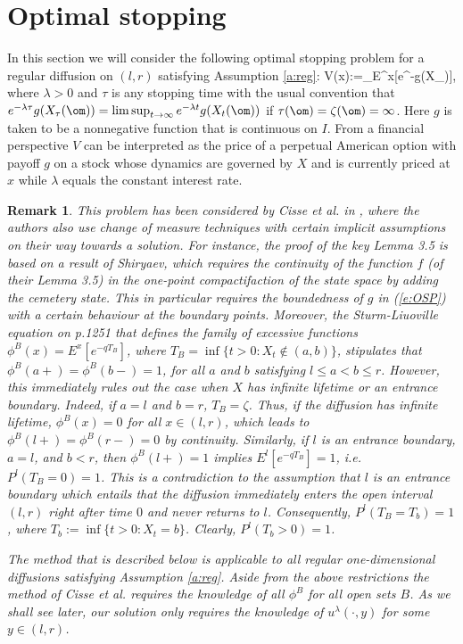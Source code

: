 \documentclass[11pt,reqno]{amsart}
\numberwithin{equation}{section}
\newtheorem{remark}{Remark}[section]
\def\rar{\rightarrow}
\begin{document}
\section{Optimal stopping} \label{s:OS}
In this section we will consider the  following optimal stopping problem for a regular diffusion on $(l,r)$ satisfying Assumption \ref{a:reg}:
\be \label{e:OSP}
V(x):=\sup_{\tau \leq \zeta}E^x[e^{-\lambda \tau}g(X_{\tau})],
\ee
where $\lambda>0$ and $\tau$ is any stopping time with the usual convention that $e^{-\lambda \tau}g(X_{\tau}(\om))=\limsup_{t\rar \infty}e^{-\lambda t}g(X_{t}(\om))$ if $\tau(\om)=\zeta(\om)=\infty$. Here $g$ is taken to be a nonnegative function that is continuous on $I$.  From a financial perspective $V$ can be interpreted as the price of a perpetual American option with payoff $g$ on a stock whose dynamics are governed by $X$ and is currently priced at $x$  while $\lambda$ equals  the constant interest rate.  
\begin{remark} \label{r:cetal}
	This problem has been considered by Cisse et al. in \cite{CPT}, where the authors also use change of measure techniques with certain implicit assumptions on their way towards a solution. For instance, the proof of the key Lemma 3.5 is based on a result of Shiryaev, which requires the continuity of the function $f$ (of their Lemma 3.5) in the one-point compactifaction of the state space by adding the cemetery state. This in particular requires the boundedness of $g$ in (\ref{e:OSP}) with a certain behaviour at the boundary points. Moreover, the Sturm-Liuoville equation on p.1251 that defines the family of excessive functions $\phi^B(x)=E^x[e^{-qT_B}]$, where $T_B=\inf\{t>0:X_t \notin (a,b)\}$, stipulates that $\phi^B(a+)=\phi^B(b-)=1$, for all $a$ and $b$ satisfying $l\leq a<b\leq r$. However, this immediately rules out the case when $X$ has infinite lifetime or an entrance boundary. Indeed, if $a=l$ and $b=r$, $T_B=\zeta$. Thus, if the diffusion has infinite lifetime, $\phi^B(x)=0$ for all $x\in (l,r)$, which leads to $\phi^B(l+)=\phi^B(r-)=0$ by continuity. Similarly, if $l$ is an entrance boundary, $a=l$, and $b<r$, then $\phi^B(l+)=1$ implies $E^l[e^{-qT_B}]=1$, i.e. $P^l(T_B=0)=1$. This is a contradiction to the assumption that $l$ is an entrance boundary which entails that  the diffusion immediately enters the open interval $(l,r)$ right after time $0$ and never returns to $l$. Consequently, $P^l(T_B=T_b)=1$, where $T_b:=\inf\{t>0:X_t=b\}$. Clearly, $P^l(T_b>0)=1$.
		
	The method that is described below is applicable to all regular one-dimensional diffusions satisfying Assumption \ref{a:reg}. Aside from the above restrictions the method of Cisse et al. requires the knowledge of all $\phi^B$ for all open sets $B$. As we shall see later, our solution only requires  the knowledge of  $u^{\lambda}(\cdot,y)$ for some $y \in (l,r)$.
\end{remark}
\end{document}
